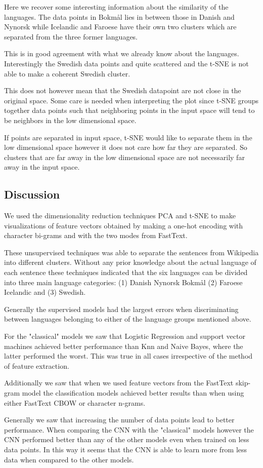 Here we recover some interesting information about the similarity of the languages. The data points in Bokmål lies in between those in Danish and Nynorsk while Icelandic and Faroese have their own two clusters which are separated from the three former languages. 

This is in good agreement with what we already know about the languages. Interestingly the Swedish data points and quite scattered and the t-SNE is not able to make a coherent Swedish cluster.

This does not however mean that the Swedish datapoint are not close in the original space. Some care is needed when interpreting the plot since t-SNE groups together data points such that neighboring points in the input space will tend to be neighbors in the low dimensional space.

If points are separated in input space, t-SNE would like to separate them in the low dimensional space however it does not care how far they are separated. So clusters that are far away in the low dimensional space are not necessarily far away in the input space.

\subsection{Discussion}
We used the dimensionality reduction techniques PCA and t-SNE to make visualizations of feature vectors obtained by making a one-hot encoding with character bi-grams and with the two modes from FastText.

These unsupervised techniques was able to separate the sentences from Wikipedia into different clusters.
Without any prior knowledge about the actual language of each sentence these techniques indicated that the six languages can be divided into three main language categories: (1) Danish Nynorsk Bokmål (2) Faroese Icelandic and (3) Swedish.


Generally the supervised models had the largest errors when discriminating between languages belonging to either of the language groups mentioned above.

For the "classical" models we saw that Logistic Regression and support vector machines achieved better performance than Knn and Naive Bayes, where the latter performed the worst. This was true in all cases irrespective of the method of feature extraction.

Additionally we saw that when we used feature vectors from the FastText skip-gram model the classification models achieved better results than when using either FastText CBOW or character n-grams.

Generally we saw that increasing the number of data points lead to better performance. When comparing the CNN with the "classical" models however the CNN performed better than any of the other models even when trained on less data points. In this way it seems that the CNN is able to learn more from less data when compared to the other models.
